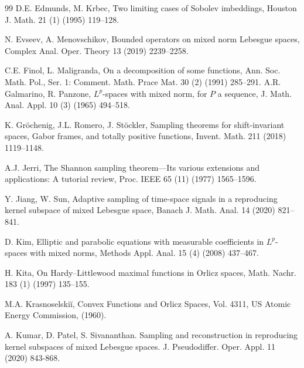 \documentclass[11pt, a4paper]{article}
\theoremstyle{definition}
\numberwithin{equation}{section}
\begin{document}
\begin{thebibliography}{99}
 D.E. Edmunds, M. Krbec, Two limiting cases of Sobolev imbeddings, Houston J. Math. 21 (1) (1995) 119–128.

 N. Evseev, A. Menovschikov, Bounded operators on mixed norm Lebesgue spaces, Complex Anal. Oper. Theory 13 (2019) 2239–2258.

C.E. Finol, L. Maligranda, On a decomposition of some functions, Ann. Soc. Math. Pol., Ser. 1: Comment. Math. Prace Mat. 30 (2) (1991) 285–291.
 A.R. Galmarino, R. Panzone, $L^p$-spaces with mixed norm, for $P$ a sequence, J. Math. Anal. Appl. 10 (3) (1965) 494–518.


K. Gröchenig, J.L. Romero, J. Stöckler, Sampling theorems for shift-invariant spaces, Gabor frames, and totally positive functions, Invent. Math. 211 (2018) 1119–1148.




 A.J. Jerri, The Shannon sampling theorem—Its various extensions and applications: A tutorial review, Proc. IEEE 65 (11) (1977) 1565–1596.

 Y. Jiang, W. Sun, Adaptive sampling of time-space signals in a reproducing kernel subspace of mixed Lebesgue space, Banach J. Math. Anal. 14 (2020) 821–841.

 D. Kim, Elliptic and parabolic equations with measurable coefficients in $L^p$-spaces with mixed norms, Methods Appl. Anal. 15 (4) (2008) 437–467.

 H. Kita, On Hardy–Littlewood maximal functions in Orlicz spaces, Math. Nachr. 183 (1) (1997) 135–155.

 M.A. Krasnoselskiĭ, Convex Functions and Orlicz Spaces, Vol. 4311, US Atomic Energy Commission, (1960).

 A. Kumar, D. Patel, S. Sivananthan. Sampling and reconstruction in reproducing kernel subspaces of mixed Lebesgue spaces. J. Pseudodiffer. Oper. Appl. 11 (2020) 843-868.



\end{thebibliography}
\end{document}
